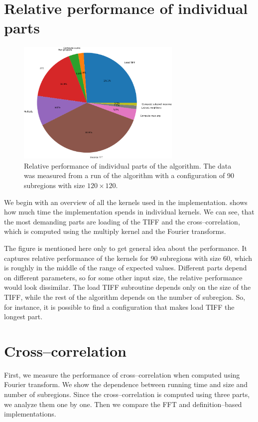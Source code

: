 \section{Relative performance of individual parts}

\begin{figure}
	\centering
	\includegraphics[width=0.7\textwidth]{img/eval/individual-parts}
	\caption{Relative performance of individual parts of the algorithm. The data was measured from a run of the algorithm with a configuration of 90 subregions with size $120 \times 120$.}
	\label{individual-parts}
\end{figure}

We begin with an overview of all the kernels used in the implementation.  shows how much time the implementation spends in individual kernels. We can see, that the most demanding parts are loading of the TIFF and the cross--correlation, which is computed using the multiply kernel and the Fourier transforms.

The figure is mentioned here only to get general idea about the performance. It captures relative performance of the kernels for 90 subregions with size 60, which is roughly in the middle of the range of expected values. Different parts depend on different parameters, so for some other input size, the relative performance would look dissimilar. The load TIFF subroutine depends only on the size of the TIFF, while the rest of the algorithm depends on the number of subregion. So, for instance, it is possible to find a configuration that makes load TIFF the longest part. 

\section{Cross--correlation}
First, we measure the performance of cross--correlation when computed using Fourier transform. We show the dependence between running time and size and number of subregions. Since the cross--correlation is computed using three parts, we analyze them one by one. Then we compare the FFT and definition--based implementations.


